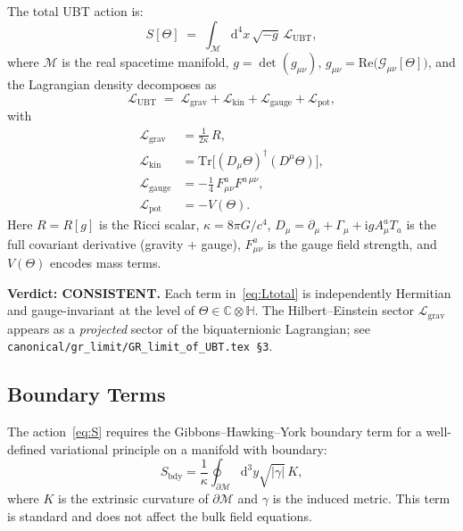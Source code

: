 \documentclass[11pt,a4paper]{article}
\theoremstyle{definition}
\theoremstyle{remark}
\begin{document}
The total UBT action is:
\begin{equation}\label{eq:S}
  S[\Theta]
  \;=\;
  \int_{\mathcal{M}} \mathrm{d}^4x\,\sqrt{-g}\,\mathcal{L}_{\mathrm{UBT}},
\end{equation}
where $\mathcal{M}$ is the real spacetime manifold, $g = \det(g_{\mu\nu})$,
$g_{\mu\nu} = \mathrm{Re}\bigl(\mathcal{G}_{\mu\nu}[\Theta]\bigr)$,
and the Lagrangian density decomposes as
\begin{equation}\label{eq:Ltotal}
  \mathcal{L}_{\mathrm{UBT}}
  \;=\;
  \mathcal{L}_{\mathrm{grav}}
  + \mathcal{L}_{\mathrm{kin}}
  + \mathcal{L}_{\mathrm{gauge}}
  + \mathcal{L}_{\mathrm{pot}},
\end{equation}
with
\begin{align}
  \mathcal{L}_{\mathrm{grav}}  &= \frac{1}{2\kappa}\,R,
  \label{eq:Lgrav}\\
  \mathcal{L}_{\mathrm{kin}}   &= \mathrm{Tr}\!\bigl[(D_\mu\Theta)^\dagger(D^\mu\Theta)\bigr],
  \label{eq:Lkin}\\
  \mathcal{L}_{\mathrm{gauge}} &= -\tfrac{1}{4}\,F^a_{\mu\nu}F^{a\,\mu\nu},
  \label{eq:Lgauge}\\
  \mathcal{L}_{\mathrm{pot}}   &= -V(\Theta).
  \label{eq:Lpot}
\end{align}
Here $R = R[g]$ is the Ricci scalar, $\kappa = 8\pi G/c^4$,
$D_\mu = \partial_\mu + \Gamma_\mu + \mathrm{i}g A^a_\mu T_a$ is the full
covariant derivative (gravity + gauge), $F^a_{\mu\nu}$ is the gauge field
strength, and $V(\Theta)$ encodes mass terms.

\begin{tcolorbox}[colback=green!4!white,colframe=green!50!black,title=Consistency check: decomposition]
\textbf{Verdict: CONSISTENT.}
Each term in~\eqref{eq:Ltotal} is independently Hermitian and gauge-invariant
at the level of $\Theta \in \mathbb{C}\otimes\mathbb{H}$.
The Hilbert--Einstein sector $\mathcal{L}_{\mathrm{grav}}$ appears as a
\emph{projected} sector of the biquaternionic Lagrangian; see
\texttt{canonical/gr\_limit/GR\_limit\_of\_UBT.tex \S3}.
\end{tcolorbox}

\subsection{Boundary Terms}

The action~\eqref{eq:S} requires the Gibbons--Hawking--York boundary term for
a well-defined variational principle on a manifold with boundary:
\begin{equation}
  S_{\mathrm{bdy}} = \frac{1}{\kappa}\oint_{\partial\mathcal{M}} \mathrm{d}^3y
  \sqrt{|\gamma|}\,K,
\end{equation}
where $K$ is the extrinsic curvature of $\partial\mathcal{M}$ and $\gamma$ is
the induced metric. This term is standard and does not affect the bulk field
equations.
\end{document}
